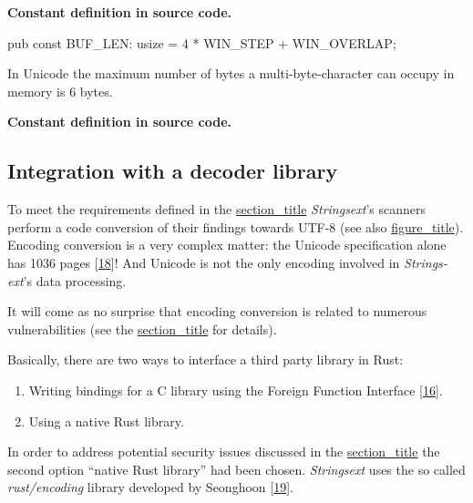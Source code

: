 \textbf{Constant definition in source code.}

pub const BUF\_LEN: usize = 4 * WIN\_STEP + WIN\_OVERLAP;

In Unicode the maximum number of bytes a multi-byte-character can occupy
in memory is 6 bytes.

\textbf{Constant definition in source code.}

\begin{Shaded}
\begin{Highlighting}[]
      \NormalTok{= }\NormalTok{;}
\end{Highlighting}
\end{Shaded}

\hypertarget{decoder}{\subsection{Integration with a decoder
library}\label{decoder}}

To meet the requirements defined in the
\protect\hyperlink{character-encoding-support}{section\_title}
\emph{Strings­ext}'s scanners perform a code conversion of their
findings towards UTF-8 (see also
\protect\hyperlink{data-processing-and-threads}{figure\_title}).
Encoding conversion is a very complex matter: the Unicode specification
alone has 1036 pages
{[}\protect\hyperlink{unicodeconsortium2016}{18}{]}! And Unicode is not
the only encoding involved in \emph{Strings­ext}'s data processing.

It will come as no surprise that encoding conversion is related to
numerous vulnerabilities (see the
\protect\hyperlink{security2}{section\_title} for details).

Basically, there are two ways to interface a third party library in
Rust:

\begin{enumerate}
\def\labelenumi{\arabic{enumi}.}
\item
  Writing bindings for a C library using the Foreign Function Interface
  {[}\protect\hyperlink{rustprogramminglanguage2016}{16}{]}.
\item
  Using a native Rust library.
\end{enumerate}

In order to address potential security issues discussed in the
\protect\hyperlink{security2}{section\_title} the second option ``native
Rust library'' had been chosen. \emph{Strings­ext} uses the so called
\emph{rust/encoding} library developed by Seonghoon
{[}\protect\hyperlink{seonghoon2016}{19}{]}.

